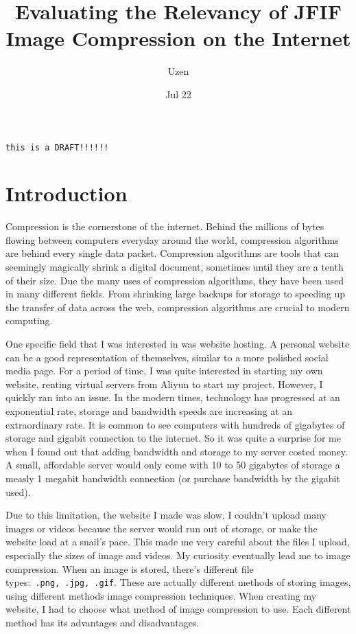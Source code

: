 \documentclass{article}
\title{Evaluating the Relevancy of JFIF Image Compression on the Internet}
\author{Uzen}
\date{Jul 22}
\begin{document}
\maketitle

{\LARGE \tt this is a DRAFT!!!!!!}

\tableofcontents
\newpage

\section{Introduction}
Compression is the cornerstone of the internet.
Behind the millions of bytes flowing between computers everyday around the world, compression algorithms are behind every single data packet.
Compression algorithms are tools that can seemingly magically shrink a digital document, sometimes until they are a tenth of their size.
Due the many uses of compression algorithms, they have been used in many different fields.
From shrinking large backups for storage to speeding up the transfer of data across the web, compression algorithms are crucial to modern computing.

One specific field that I was interested in was website hosting.
A personal website can be a good representation of themselves, similar to a more polished social media page.
For a period of time, I was quite interested in starting my own website, renting virtual servers from Aliyun to start my project.
However, I quickly ran into an issue.
In the modern times, technology has progressed at an exponential rate, storage and bandwidth speeds are increasing at an extraordinary rate.
It is common to see computers with hundreds of gigabytes of storage and gigabit connection to the internet.
So it was quite a surprise for me when I found out that adding bandwidth and storage to my server costed money.
A small, affordable server would only come with 10 to 50 gigabytes of storage a measly 1 megabit bandwidth connection (or purchase bandwidth by the gigabit used).

Due to this limitation, the website I made was slow.
I couldn't upload many images or videos because the server would run out of storage, or make the website load at a snail's pace.
This made me very careful about the files I upload, especially the sizes of image and videos.
My curiosity eventually lead me to image compression.
When an image is stored, there's different file types:\texttt{~.png,~.jpg,~.gif}.
These are actually different methods of storing images, using different methods image compression techniques.
When creating my website, I had to choose what method of image compression to use.
Each different method has its advantages and disadvantages.
\end{document}
